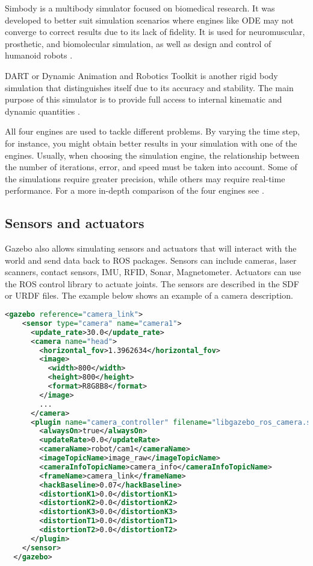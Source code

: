 Simbody is a multibody simulator focused on biomedical research. It was developed to better suit simulation scenarios where engines like ODE may not converge to correct results due to its lack of fidelity. It is used for neuromuscular, prosthetic, and biomolecular simulation, as well as design and control of humanoid robots \cite{sherman2011simbody}.

DART or Dynamic Animation and Robotics Toolkit is another rigid body simulation that distinguishes itself due to its accuracy and stability. The main purpose of this simulator is to provide full access to internal kinematic and dynamic quantities \cite{lee2018dart}.

All four engines are used to tackle different problems. By varying the time step, for instance, you might obtain better results in your simulation with one of the engines. Usually, when choosing the simulation engine, the relationship between the number of iterations, error, and speed must be taken into account. Some of the simulations require greater precision, while others may require real-time performance. For a more in-depth comparison of the four engines see \cite{peters2014comparison}.

\subsection{Sensors and actuators}

Gazebo also allows simulating sensors and actuators that will interact with the world and send data back to ROS packages. Sensors can include cameras, laser scanners, contact sensors, IMU, RFID, Sonar, Magnetometer. Actuators can use the ROS control library to actuate joints. The sensors are described in the SDF or URDF files. The example below shows an example of a camera description.

\begin{lstlisting}[caption=Camera Description., language=XML]
  <gazebo reference="camera_link">
    <sensor type="camera" name="camera1">
      <update_rate>30.0</update_rate>
      <camera name="head">
        <horizontal_fov>1.3962634</horizontal_fov>
        <image>
          <width>800</width>
          <height>800</height>
          <format>R8G8B8</format>
        </image>
        ...
      </camera>
      <plugin name="camera_controller" filename="libgazebo_ros_camera.so">
        <alwaysOn>true</alwaysOn>
        <updateRate>0.0</updateRate>
        <cameraName>robot/cam1</cameraName>
        <imageTopicName>image_raw</imageTopicName>
        <cameraInfoTopicName>camera_info</cameraInfoTopicName>
        <frameName>camera_link</frameName>
        <hackBaseline>0.07</hackBaseline>
        <distortionK1>0.0</distortionK1>
        <distortionK2>0.0</distortionK2>
        <distortionK3>0.0</distortionK3>
        <distortionT1>0.0</distortionT1>
        <distortionT2>0.0</distortionT2>
      </plugin>
    </sensor>
  </gazebo>
\end{lstlisting}

